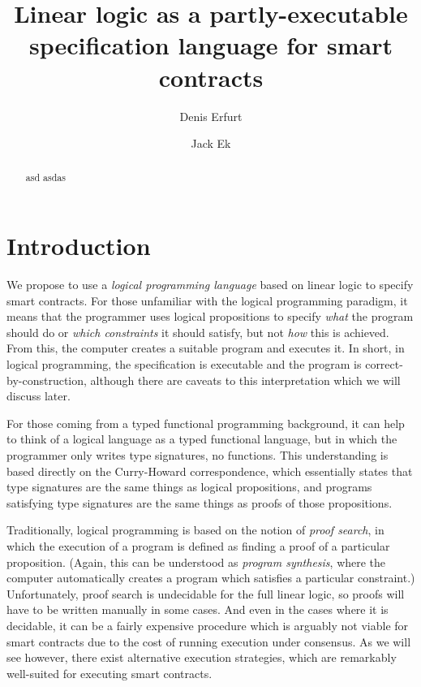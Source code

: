 \documentclass[sigconf]{acmart}
\begin{document}
\title{Linear logic as a partly-executable specification language for smart contracts}
\author{Denis Erfurt \and Jack Ek}

\begin{abstract}
  asd asdas
\end{abstract}

\maketitle

\section{Introduction}
We propose to use a \emph{logical programming language} based on linear logic to specify smart contracts. For those unfamiliar with the logical programming paradigm, it means that the programmer uses logical propositions to specify \emph{what} the program should do or \emph{which constraints} it should satisfy, but not \emph{how} this is achieved. From this, the computer creates a suitable program and executes it. In short, in logical programming, the specification is executable and the program is correct-by-construction, although there are caveats to this interpretation which we will discuss later.

For those coming from a typed functional programming background, it can help to think of a logical language as a typed functional language, but in which the programmer only writes type signatures, no functions. This understanding is based directly on the Curry-Howard correspondence, which essentially states that type signatures are the same things as logical propositions, and programs satisfying type signatures are the same things as proofs of those propositions.

Traditionally, logical programming is based on the notion of \emph{proof search}, in which the execution of a program is defined as finding a proof of a particular proposition. (Again, this can be understood as \emph{program synthesis}, where the computer automatically creates a program which satisfies a particular constraint.) Unfortunately, proof search is undecidable for the full linear logic, so proofs will have to be written manually in some cases. And even in the cases where it is decidable, it can be a fairly expensive procedure which is arguably not viable for smart contracts due to the cost of running execution under consensus. As we will see however, there exist alternative execution strategies, which are remarkably well-suited for executing smart contracts.
\end{document}
